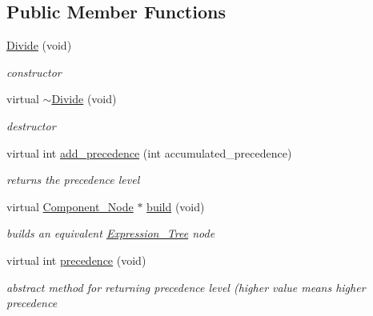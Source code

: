 \subsection*{Public Member Functions}
\begin{DoxyCompactItemize}
\item 
\hyperlink{classMadara_1_1Expression__Tree_1_1Divide_a6d0a03cf7bad2c2e8294c5f6c030c93f}{Divide} (void)
\begin{DoxyCompactList}\small\item\em constructor \item\end{DoxyCompactList}\item 
virtual \hyperlink{classMadara_1_1Expression__Tree_1_1Divide_aafb8ec107e842b0e1e3e20f0566f1196}{$\sim$Divide} (void)
\begin{DoxyCompactList}\small\item\em destructor \item\end{DoxyCompactList}\item 
virtual int \hyperlink{classMadara_1_1Expression__Tree_1_1Divide_a8e6619a58a2afdad326f3187a2fbf35c}{add\_\-precedence} (int accumulated\_\-precedence)
\begin{DoxyCompactList}\small\item\em returns the precedence level \item\end{DoxyCompactList}\item 
virtual \hyperlink{classMadara_1_1Expression__Tree_1_1Component__Node}{Component\_\-Node} $\ast$ \hyperlink{classMadara_1_1Expression__Tree_1_1Divide_a93b9d86afc48c469b41bd86ff7d23614}{build} (void)
\begin{DoxyCompactList}\small\item\em builds an equivalent \hyperlink{classMadara_1_1Expression__Tree_1_1Expression__Tree}{Expression\_\-Tree} node \item\end{DoxyCompactList}\item 
virtual int \hyperlink{classMadara_1_1Expression__Tree_1_1Symbol_ac060dedb8d16864591b259df375109b3}{precedence} (void)
\begin{DoxyCompactList}\small\item\em abstract method for returning precedence level (higher value means higher precedence \item\end{DoxyCompactList}\end{DoxyCompactItemize}
